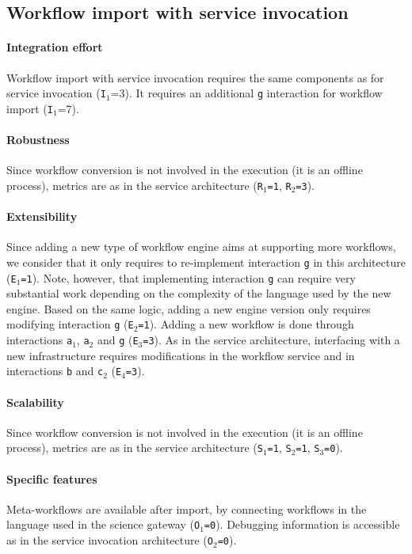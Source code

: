 \documentclass[preprint,3p,twocolumn]{elsarticle}
\begin{document}
\subsection{Workflow import with service invocation}

\paragraph{Integration effort} Workflow import with service invocation
requires the same components as for service invocation
(\texttt{I$_1$}=3). It requires an additional \texttt{g} interaction
for workflow import (\texttt{I$_1$}=7).

\paragraph{Robustness} Since workflow conversion is not involved in
the execution (it is an offline process), metrics are as in the
service architecture (\texttt{R$_1$=1}, \texttt{R$_2$=3}).

\paragraph{Extensibility} Since adding a new type of workflow engine
aims at supporting more workflows, we consider that it only requires
to re-implement interaction \texttt{g} in this architecture  (\texttt{E$_1$=1}). Note,
however, that implementing interaction \texttt{g} can require very
substantial work depending on the complexity of the language used by
the new engine. Based on the same logic, adding a
new engine version only requires modifying interaction \texttt{g}
(\texttt{E$_2$=1}).  Adding a new workflow is done through
interactions \texttt{a$_1$}, \texttt{a$_2$} and \texttt{g} (\texttt{E$_3$=3}). As in the
service architecture, interfacing with a new infrastructure requires
modifications in the workflow service and in interactions \texttt{b}
and \texttt{c$_2$} (\texttt{E$_4$=3}).

\paragraph{Scalability}  Since workflow conversion is not involved in
the execution (it is an offline process), metrics are as in the
service architecture (\texttt{S$_1$=1},
\texttt{S$_2$=1}, \texttt{S$_3$=0}).

\paragraph{Specific features} Meta-workflows are available after import,
by connecting workflows in the language used in the science gateway
(\texttt{O$_1$=0}). Debugging information is accessible as in the
service invocation architecture (\texttt{O$_2$=0}).
\end{document}
